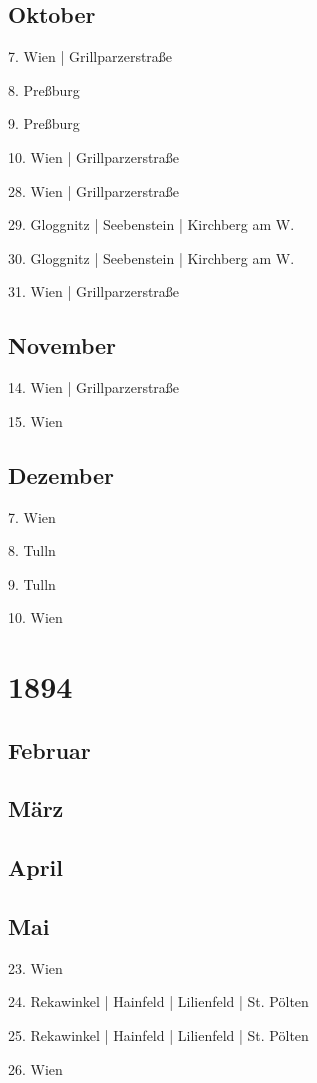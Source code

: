 \documentclass[twoside=false,titlepage=false,open=any, parskip=never, fontsize=10pt, headings=small, chapterprefix=false, appendixprefix=false, DIV=15]{scrbook}
\begin{document}
\begin{multicols}{3}
            \section*{Oktober}
            7. Wien | Grillparzerstraße\par
            8. Preßburg\par
            9. Preßburg\par
            10. Wien | Grillparzerstraße\par
            28. Wien | Grillparzerstraße\par
            29. Gloggnitz | Seebenstein | Kirchberg am W.\par
            30. Gloggnitz | Seebenstein | Kirchberg am W.\par
            31. Wien | Grillparzerstraße\par
            \section*{November}
            14. Wien | Grillparzerstraße\par
            15. Wien\par
            \section*{Dezember}
            7. Wien\par
            8. Tulln\par
            9. Tulln\par
            10. Wien\par
            \chapter*{1894}
            \section*{Februar}
            \section*{März}
            \section*{April}
            \section*{Mai}
            23. Wien\par
            24. Rekawinkel | Hainfeld | Lilienfeld | St. Pölten\par
            25. Rekawinkel | Hainfeld | Lilienfeld | St. Pölten\par
            26. Wien\par

\end{multicols}
\end{document}

